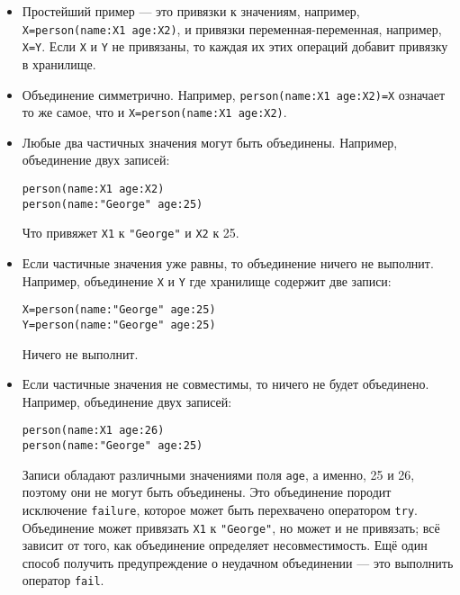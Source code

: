 \begin{itemize}

  \item{Простейший пример --- это привязки к значениям, например, \lstinline!X=person(name:X1 age:X2)!, и привязки переменная-переменная, например, \lstinline!X=Y!. Если \lstinline!X! и \lstinline!Y! не привязаны, то каждая их этих операций добавит привязку в хранилище.}

\item{Объединение симметрично. Например, \lstinline!person(name:X1 age:X2)=X! означает то же самое, что и \lstinline!X=person(name:X1 age:X2)!.}

\item{Любые два частичных значения могут быть объединены. Например, объединение двух записей:

  \begin{lstlisting}
person(name:X1 age:X2)
person(name:"George" age:25)
  \end{lstlisting}
  
Что привяжет \lstinline!X1! к \lstinline!"George"! и \lstinline!X2! к 25.}

\item{Если частичные значения уже равны, то объединение ничего не выполнит. Например, объединение \lstinline!X! и \lstinline!Y! где хранилище содержит две записи:

  \begin{lstlisting}
X=person(name:"George" age:25)
Y=person(name:"George" age:25)
  \end{lstlisting}
  
Ничего не выполнит.}

\item{Если частичные значения не совместимы, то ничего не будет объединено. Например, объединение двух записей:

  \begin{lstlisting}
person(name:X1 age:26)
person(name:"George" age:25)
  \end{lstlisting}
  
Записи обладают различными значениями поля \lstinline!age!, а именно, 25 и 26, поэтому они не могут быть объединены. Это объединение породит исключение \lstinline!failure!, которое может быть перехвачено оператором \lstinline!try!. Объединение может привязать \lstinline!X1! к \lstinline!"George"!, но может и не привязать; всё зависит от того, как объединение определяет несовместимость. Ещё один способ получить предупреждение о неудачном объединении --- это выполнить оператор \lstinline!fail!.}


\end{itemize}
